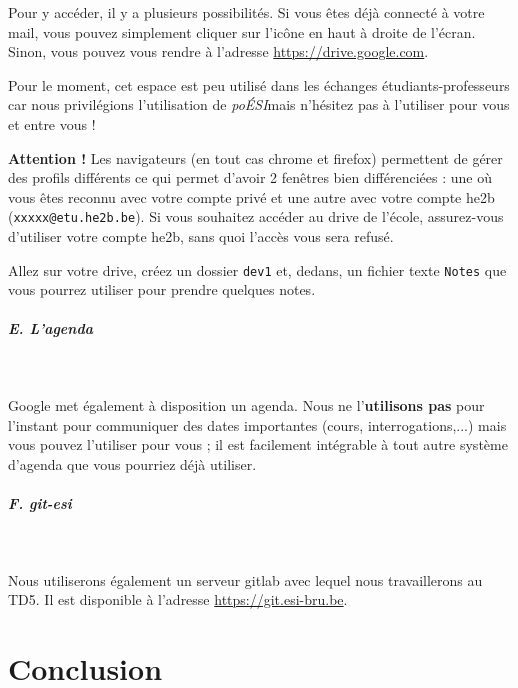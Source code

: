 \documentclass[a4paper,11pt]{article}
\begin{document}
 \par 
 Pour y acc\'eder, il y a plusieurs possibilit\'es. Si vous \^etes d\'ej\`a connect\'e \`a votre mail, vous pouvez simplement cliquer sur l'ic\^one en haut \`a droite de l'\'ecran. Sinon, vous pouvez vous rendre \`a l'adresse \url{https://drive.google.com}.
			
 \par
Pour le moment, cet espace est peu utilis\'e dans les \'echanges \'etudiants-professeurs car nous privil\'egions l'utilisation de \textit{po\'ESI}mais n'h\'esitez pas \`a l'utiliser pour vous et entre vous !
\par 
\textbf{Attention !} Les navigateurs (en tout cas chrome et firefox) permettent de gérer des profils différents ce qui permet d'avoir 2 fenêtres bien différenciées : une où vous êtes reconnu avec votre compte privé et une autre avec votre compte he2b (\verb_xxxxx@etu.he2b.be_). Si vous souhaitez accéder au drive de l'école, assurez-vous d'utiliser votre compte he2b, sans quoi l'accès vous sera refusé.			
\par
\begin{Exercice}{}
Allez sur votre drive, cr\'eez un dossier \verb_dev1_ et, dedans, un fichier texte \verb_Notes_ que vous pourrez utiliser pour prendre quelques notes.
\end{Exercice}

 \par
        
\subparagraph{E. L'agenda} 

\textcolor{white}{.} \par
Google met \'egalement \`a disposition un agenda. Nous ne l'\textbf{utilisons pas} pour l'instant pour communiquer des dates importantes (cours, interrogations,...) mais vous pouvez l'utiliser pour vous ; il est facilement int\'egrable \`a tout autre syst\`eme d'agenda que vous pourriez d\'ej\`a utiliser.
			
\par
\subparagraph{F. git-esi}
\textcolor{white}{.} \par
Nous utiliserons également un serveur gitlab avec lequel nous travaillerons au TD5. Il est disponible à l'adresse \url{https://git.esi-bru.be}.

\par
\section{Conclusion}
\end{document}

